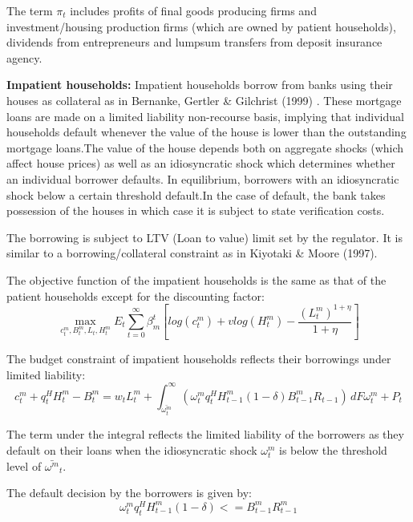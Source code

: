 \documentclass[12pt]{article}
\numberwithin{equation}{section}
\begin{document}
The term $\pi_{t}$ includes profits of final goods producing firms and investment/housing production firms (which are owned by patient households), dividends from entrepreneurs and lumpsum transfers from deposit insurance agency. 






\textbf{Impatient households:}
Impatient households borrow from banks using their houses as collateral as in Bernanke, Gertler \& Gilchrist (1999) . These mortgage loans are made on a limited liability non-recourse basis,  implying that individual households default whenever the value of the house is lower than the outstanding mortgage loans.The value of the house depends both on aggregate shocks (which affect house prices) as well as an idiosyncratic shock which determines whether an individual borrower defaults. In equilibrium, borrowers with an idiosyncratic shock below a certain threshold default.In the case of default, the bank takes possession of the houses in which case it is subject to state verification costs.

The borrowing is subject to LTV (Loan to value) limit set by the regulator. It is similar to a borrowing/collateral constraint as in Kiyotaki \& Moore (1997).

The objective function of the impatient households is the same as that of the patient households except for the discounting factor:
\begin{equation}
\max_{c^m_t,B^m_t,L_{t},H^m_t}E_t\sum _{t=0}^{\infty } \beta^t_{m} [log(c^m_t)+vlog(H^m_t)-\frac{(L^m_t)^{1+\eta}}{1+\eta} ]
\end{equation}

The budget constraint of impatient households reflects their borrowings under limited liability:
\begin{equation}
c^m_t+q^H_{t}H^m_{t} -B^m_{t}=w_{t}L^m_{t}+\int_{\bar{\omega^m_{t} }}^\infty  \left(\omega^m_{t} q^H_{t} H^m_{t-1} (1-\delta)B^m_{t-1}R_{t-1}\right) \, dF\omega^m_{t} + P_{t}
\end{equation}

The term under the integral reflects the limited liability of the borrowers as they default on their loans when the idiosyncratic shock $\omega^m_{t}$ is below the threshold level of $\bar{\omega^m}_t$. 

The default decision by the borrowers is given by:
\begin{equation}
{{\omega^m_{t} }}q^H_{t} H^m_{t-1}(1-\delta) <= B^m_{t-1}R^m_{t-1}
\end{equation}
\end{document}
